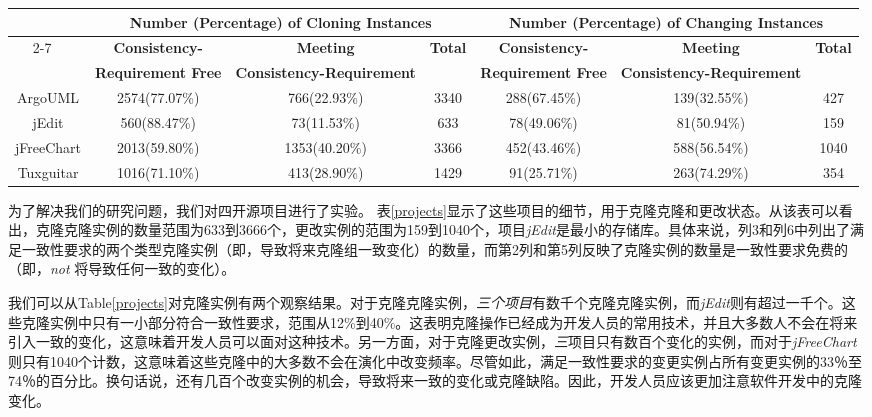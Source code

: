 \begin{table*}[ht]
\caption{The four open source projects for experiments}
\label{projects}
\centering
\begin{tabular}{|c|c|c|c|c|c|c|}
\hline
~\multirow{3}{*}{\textbf{Project}}& \multicolumn{3}{|c|}{\textbf{Number (Percentage) of Cloning Instances}} &  \multicolumn{3}{|c|}{\textbf{Number (Percentage) of Changing Instances}} \\ 
 \cline{2-7}
~&\textbf{Consistency-} &\textbf{Meeting} &\multirow{2}{*}{\textbf{Total}}& \textbf{Consistency-} &\textbf{Meeting} &\multirow{2}{*}{\textbf{Total}}\\
~&\textbf{Requirement Free}&\textbf{Consistency-Requirement}&~&\textbf{Requirement Free}&\textbf{Consistency-Requirement}&\\
\hline
ArgoUML&	2574(77.07\%)&	766(22.93\%)&	3340&288(67.45\%)&139(32.55\%)&427\\
\hline
jEdit&560(88.47\%)&	73(11.53\%)&	633&78(49.06\%)&81(50.94\%)&159\\
\hline
jFreeChart&	2013(59.80\%)&	1353(40.20\%)&	3366&452(43.46\%)&588(56.54\%)&1040\\
\hline
Tuxguitar&	1016(71.10\%)&	413(28.90\%)&	1429&91(25.71\%)&263(74.29\%)&354\\
\hline
\end{tabular}
\end{table*}

为了解决我们的研究问题，我们对{四}开源项目进行了实验。
表\ref{projects}显示了这些项目的细节，用于克隆克隆和更改状态。从该表可以看出，克隆克隆实例的数量范围为633到3666个，更改实例的范围为159到1040个，项目{\em jEdit}是最小的存储库。具体来说，列3和列6中列出了满足一致性要求的两个类型克隆实例（即，导致将来克隆组一致变化）的数量，而第2列和第5列反映了克隆实例的数量是一致性要求免费的（即，{\em not \/}将导致任何一致的变化）。

我们可以从Table\ref{projects}对克隆实例有两个观察结果。对于克隆克隆实例，{\em  三个项目}有数千个克隆克隆实例，而{\em jEdit}则有超过一千个。这些克隆实例中只有一小部分符合一致性要求，范围从12\%到40\%。这表明克隆操作已经成为开发人员的常用技术，并且大多数人不会在将来引入一致的变化，这意味着开发人员可以面对这种技术。另一方面，对于克隆更改实例，{\em  三}项目只有数百个变化的实例，而对于{\em  jFreeChart}则只有1040个计数，这意味着这些克隆中的大多数不会在演化中改变频率。尽管如此，满足一致性要求的变更实例占所有变更实例的33％至74％的百分比。换句话说，还有几百个改变实例的机会，导致将来一致的变化或克隆缺陷。因此，开发人员应该更加注意软件开发中的克隆变化。

